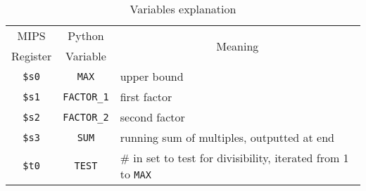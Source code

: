 \begin{table}[H]
\begin{center}

\caption{\small Variables explanation}

\vspace{5mm}

\begin{tabular}{ccc}

\toprule 

MIPS          & Python             & \multirow{2}{*}{Meaning}\\
Register      & Variable           & 
\\

\midrule

\texttt{\$s0} & \texttt{MAX}       & 
\multicolumn{1}{l}{upper bound}
\\

\texttt{\$s1} & \texttt{FACTOR\_1} & 
\multicolumn{1}{l}{first factor}
\\

\texttt{\$s2} & \texttt{FACTOR\_2} & 
\multicolumn{1}{l}{second factor}
\\

\texttt{\$s3} & \texttt{SUM}       & 
\multicolumn{1}{l}{running sum of multiples, outputted at end}
\\

\texttt{\$t0} & \texttt{TEST}      & 
\multicolumn{1}{l}{\# in set to test for divisibility, iterated from 1 to \texttt{MAX}}
\\

\bottomrule

\end{tabular}
\end{center}
\end{table}